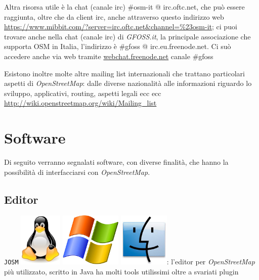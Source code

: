 \documentclass[a4paper,twoside,12pt,]{article}
\newcommand{\osm}{\emph{OpenStreetMap}\xspace}
\newcommand{\soft}[1]{\texttt{#1}}
\newcommand{\pro}[1]{\emph{#1}}
\begin{document}
Altra risorsa utile è la chat (canale irc) \#osm-it @ irc.oftc.net, che può essere raggiunta, oltre che da client irc, anche attraverso questo indirizzo web \url{https://www.mibbit.com/?server=irc.oftc.net\&channel=\%23osm-it}; ci puoi trovare anche nella chat (canale irc) di \pro{GFOSS.it}, la principale associazione che supporta OSM in Italia, l'indirizzo è \#gfoss @ irc.eu.freenode.net. Ci suò accedere anche via web tramite \url{webchat.freenode.net}  canale \#gfoss

Esistono inoltre molte altre mailing list internazionali che trattano particolari aspetti di \osm: dalle diverse nazionalità alle informazioni riguardo lo sviluppo, applicativi, routing, aspetti legali ecc ecc \url{http://wiki.openstreetmap.org/wiki/Mailing_list}


\section{Software}
Di seguito verranno segnalati software, con diverse finalità, che hanno la possibilità di interfacciarsi con \osm.

\subsection{Editor}
\soft{JOSM} \includegraphics{./linux-logo.jpg} \includegraphics{./windows-logo.jpg} \includegraphics{./mac-logo.jpg}: l'editor per \osm più utilizzato, scritto in Java ha molti tools utilissimi oltre a svariati plugin
\end{document}
